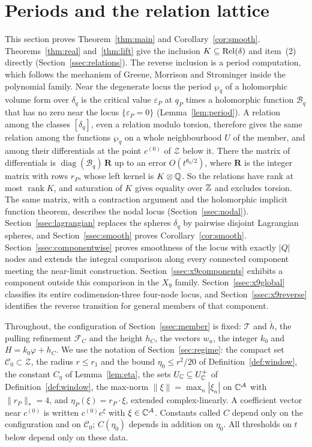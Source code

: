 \section{Periods and the relation lattice}\label{sec:periods}

This section proves Theorem~\ref{thm:main} and Corollary~\ref{cor:smooth}. Theorems~\ref{thm:real} and~\ref{thm:lift}
give the inclusion $K\subseteq\operatorname{Rel}(\delta)$ and item~(2) directly (Section~\ref{ssec:relations}). The reverse inclusion
is a period computation, which follows the mechanism of Greene, Morrison and Strominger \cite[\S2]{GMS95} inside the
polynomial family. Near the degenerate locus the period $\wp_q$ of a holomorphic volume form over $\delta_q$ is the
critical value $\varepsilon_P$ at $q_P$ times a holomorphic function $\mathcal B_q$ that has no zero near the locus
$\{\varepsilon_P=0\}$ (Lemma~\ref{lem:period}). A
relation among the classes $[\delta_q]$, even a relation modulo torsion, therefore gives the same relation among the
functions $\wp_q$ on a whole neighbourhood $U$ of the member, and among their differentials at the point $c^{(0)}$ of
$\mathcal Z$ below it. There the matrix of differentials is $\operatorname{diag}(\mathcal B_q)\,\mathbf R$ up to an error
$O(t^{\theta_0/2})$, where $\mathbf R$ is the integer matrix with rows $r_P$, whose left kernel is $K\otimes\mathbb Q$. So the
relations have rank at most $\operatorname{rank}K$, and saturation of $K$ gives equality over $\mathbb Z$ and excludes torsion.
The same matrix, with a contraction argument and the holomorphic implicit function theorem, describes the nodal locus
(Section~\ref{ssec:nodal}). Section~\ref{ssec:lagrangian} replaces the spheres $\delta_q$ by pairwise disjoint Lagrangian
spheres, and Section~\ref{ssec:smooth} proves Corollary~\ref{cor:smooth}.
Section~\ref{ssec:componentwise} proves smoothness of the locus with exactly $|Q|$ nodes and extends the integral
comparison along every connected component meeting the near-limit construction.
Section~\ref{ssec:x9components} exhibits a component outside this comparison in the $X_9$ family.
Section~\ref{ssec:x9global} classifies its entire codimension-three four-node locus, and
Section~\ref{ssec:x9reverse} identifies the reverse transition for general members of that component.

Throughout, the configuration of Section~\ref{ssec:member} is fixed: $\mathcal T$ and $\check h$, the pulling
refinement $\mathcal F_C$ and the height $h_C$, the vectors $w_u$, the integer $k_0$ and $H=k_0\varphi+h_C$. We use the
notation of Section~\ref{sec:regime}: the compact set $\mathscr C_0\subset\mathcal Z$, the radius $r\le r_1$ and the
bound $\eta_0\le r^2/20$ of Definition~\ref{def:window}, the constant $C_\eta$ of Lemma~\ref{lem:eta}, the sets
$U_\mathbb C\subseteq U^+_\mathbb C$ of Definition~\ref{def:window}, the max-norm $\|\xi\|=\max_n|\xi_n|$ on $\mathbb C^{\mathcal A}$ with
$\|r_P\|_*=4$, and $\eta_P(\xi)=r_P\cdot\xi$, extended complex-linearly. A coefficient vector near $c^{(0)}$ is written
$c^{(0)}e^\xi$ with $\xi\in\mathbb C^{\mathcal A}$. Constants called $C$ depend only on the configuration and on
$\mathscr C_0$; $C(\eta_0)$ depends in addition on $\eta_0$. All thresholds on $t$ below depend only on these data.

